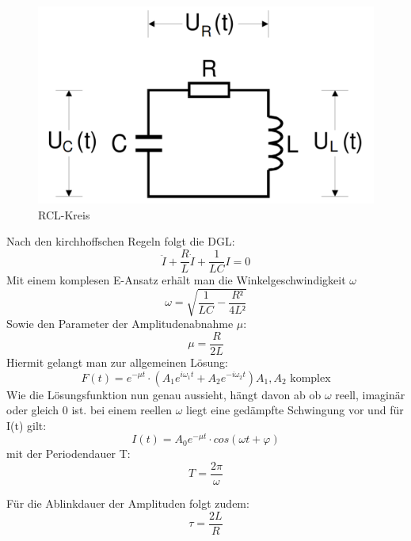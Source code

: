  \begin{figure}[H]
   \centering
   \includegraphics[width=\linewidth-200pt,height=\textheight-200pt,keepaspectratio]{content/RCL.png}
   \caption{RCL-Kreis}
   \label{fig:RCL_Kreis}
 \end{figure}

Nach den kirchhoffschen Regeln folgt die DGL:
 \begin{equation}
   \ddot{I} + \frac{R}{L} \dot{I} + \frac{1}{LC}I = 0
 \end{equation}
 Mit einem komplesen E-Ansatz erhält man die Winkelgeschwindigkeit $\omega$
 \begin{equation}
   \omega = \sqrt{\frac{1}{LC}-\frac{R²}{4L²}}
 \end{equation}
 Sowie den Parameter der Amplitudenabnahme $\mu$:
 \begin{equation}
 \mu = \frac{R}{2L}
 \end{equation}
 Hiermit gelangt man zur allgemeinen Lösung:
 \begin{equation}
   F(t) = e^{-\mu t} \cdot  \left( A_1e^{i\omega_1t} + A_2e^{-i\omega_2t} \right) \text{$A_1,A_2$ komplex}
 \end{equation}
 Wie die Lösungsfunktion nun genau aussieht, hängt davon ab ob $\omega$ reell, imaginär
  oder gleich 0 ist.
  bei einem reellen $\omega$ liegt eine gedämpfte Schwingung vor und für I(t) gilt:
  \begin{equation}
    I(t) = A_0 e^{-\mu t} \cdot cos(\omega t + \varphi)
  \end{equation}
 mit der Periodendauer T:
  \begin{equation}
    T = \frac{2 \pi}{\omega}
  \end{equation}

  Für die Ablinkdauer der Amplituden \tau folgt zudem:
  \begin{equation}
    \tau = \frac{2L}{R}
  \end{equation}

